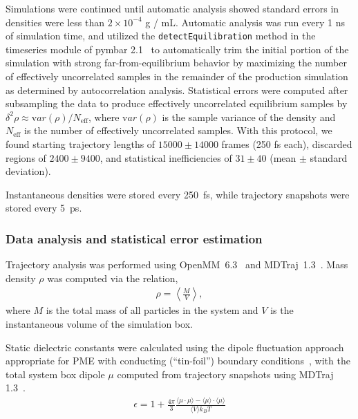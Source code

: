 \documentclass[aps,pre,twocolumn,nofootinbib,superscriptaddress,linenumbers]{revtex4-1}
\newcommand{\var}[1]{{\mathrm var}{(#1)}}
\begin{document}
Simulations were continued until automatic analysis showed standard errors in densities were less than $2 \times 10^{-4}$ g / mL.
Automatic analysis was run every 1 ns of simulation time, and utilized the {\tt detectEquilibration} method in the timeseries module of pymbar 2.1~\cite{shirts2008statistically} to automatically trim the initial portion of the simulation with strong far-from-equilibrium behavior by maximizing the number of effectively uncorrelated samples in the remainder of the production simulation as determined by autocorrelation analysis.
Statistical errors were computed after subsampling the data to produce effectively uncorrelated equilibrium samples by $\delta^2 \rho \approx \var{\rho} / N_\mathrm{eff}$, where $\var{\rho}$ is the sample variance of the density and $N_\mathrm{eff}$ is the number of effectively uncorrelated samples.  
With this protocol, we found starting trajectory lengths of $15000 \pm 14000$ frames (250 fs each), discarded regions of $2400 \pm 9400$, and statistical inefficiencies of $31 \pm 40$ (mean $\pm$ standard deviation).  

Instantaneous densities were stored every 250~fs, while trajectory snapshots were stored every 5~ps.  

\subsubsection{Data analysis and statistical error estimation}

Trajectory analysis was performed using OpenMM~6.3~\cite{eastman2012openmm} and MDTraj~1.3~\cite{mcgibbon2014mdtraj}.  
Mass density $\rho$ was computed via the relation,
\begin{eqnarray}
\rho = \left\langle \frac{M}{V} \right\rangle \label{equation:mass-density} ,
 \end{eqnarray}
where $M$ is the total mass of all particles in the system and $V$ is the instantaneous volume of the simulation box.

Static dielectric constants were calculated using the dipole fluctuation approach appropriate for PME with conducting (``tin-foil'') boundary conditions~\cite{horn2004, neumann1983dipole}, with the total system box dipole $\mu$ computed from trajectory snapshots using MDTraj 1.3~\cite{mcgibbon2014mdtraj}.
\begin{eqnarray}
\epsilon = 1 + \frac{4\pi}{3} \frac{\langle \mu \cdot \mu \rangle - \langle \mu \rangle \cdot \langle \mu \rangle}{\langle V \rangle k_B T} \label{equation:dielectric_calculation}
\end{eqnarray}
\end{document}

